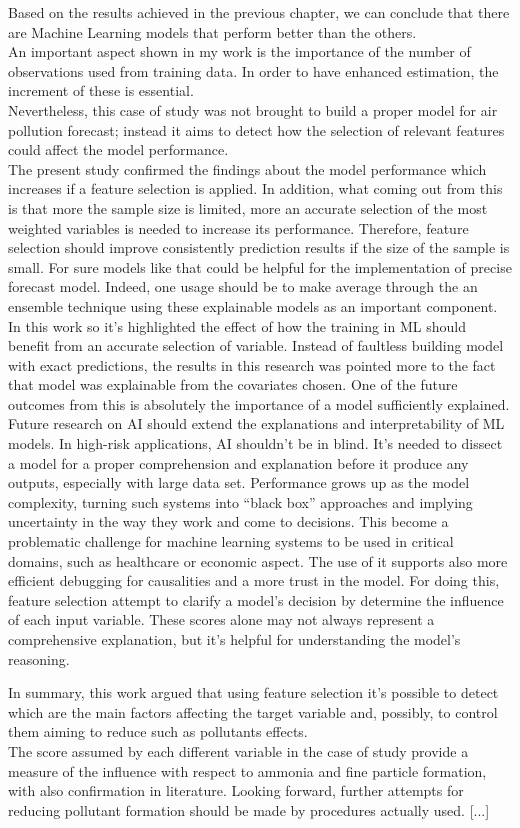 Based on the results achieved in the previous chapter, we can conclude that there are Machine Learning models that perform better than the others.\\
An important aspect shown in my work is the importance of the number of observations used from training data. In order to have enhanced estimation, the increment of these is essential.\\
Nevertheless, this case of study was not brought to build a proper model for air pollution forecast; instead it aims to detect how the selection of relevant features could affect the model performance. \\
The present study confirmed the findings about the model performance which increases if a feature selection is applied.
In addition, what coming out from this is that more the sample size is limited, more an accurate selection of the most weighted variables is needed to increase its performance.
Therefore, feature selection should improve consistently prediction results if the size of the sample is small.
For sure models like that could be helpful for the implementation of precise forecast model. Indeed, one usage should be to make average through the an ensemble technique using these explainable models as an important component.
\\
In this work so it's highlighted the effect of how the training in ML should benefit from an accurate selection of variable. 
Instead of faultless building model with exact predictions, the results in this research was pointed more to the fact that model was explainable from the covariates chosen. 
One of the future outcomes from this is absolutely the importance of a model sufficiently explained.
Future research on AI should extend the explanations and interpretability of ML models.
In high-risk applications, AI shouldn't be in blind. 
It's needed to dissect a model for a proper comprehension and explanation before it produce any outputs, especially with large data set.
Performance grows up as the model complexity, turning such systems into “black box” approaches and implying uncertainty in
the way they work and come to decisions. This become a problematic challenge for machine learning systems to be used in critical domains, such as healthcare or economic aspect.
The use of it supports also more efficient debugging for  causalities and a more trust in the model.
For doing this, feature selection attempt to clarify a model’s decision by determine the influence of each input variable. 
These scores alone may not always represent a comprehensive explanation, but it's helpful for understanding the model’s reasoning.



In summary, this work argued that using feature selection it's possible to detect which are the main factors affecting the target variable and, possibly, to control them aiming to reduce such as pollutants effects.\\
The score assumed by each different variable in the case of study provide a measure of the influence with respect to ammonia and fine particle formation, with also confirmation in literature.
Looking forward, further attempts for reducing pollutant formation should be made by procedures actually used.
[...]

